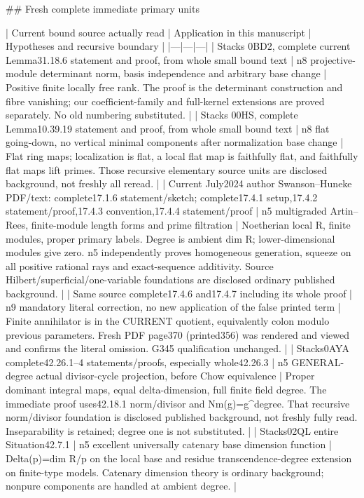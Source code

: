 \documentclass[11pt]{article}
\begin{document}
\begin{GrantData}
## Fresh complete immediate primary units

| Current bound source actually read | Application in this manuscript | Hypotheses and recursive boundary |
|---|---|---|
| Stacks 0BD2, complete current Lemma31.18.6 statement and proof, from whole small bound text | n8 projective-module determinant norm, basis independence and arbitrary base change | Positive finite locally free rank. The proof is the determinant construction and fibre vanishing; our coefficient-family and full-kernel extensions are proved separately. No old numbering substituted. |
| Stacks 00HS, complete Lemma10.39.19 statement and proof, from whole small bound text | n8 flat going-down, no vertical minimal components after normalization base change | Flat ring maps; localization is flat, a local flat map is faithfully flat, and faithfully flat maps lift primes. Those recursive elementary source units are disclosed background, not freshly all reread. |
| Current July2024 author Swanson--Huneke PDF/text: complete17.1.6 statement/sketch; complete17.4.1 setup,17.4.2 statement/proof,17.4.3 convention,17.4.4 statement/proof | n5 multigraded Artin--Rees, finite-module length forms and prime filtration | Noetherian local R, finite modules, proper primary labels. Degree is ambient dim R; lower-dimensional modules give zero. n5 independently proves homogeneous generation, squeeze on all positive rational rays and exact-sequence additivity. Source Hilbert/superficial/one-variable foundations are disclosed ordinary published background. |
| Same source complete17.4.6 and17.4.7 including its whole proof | n9 mandatory literal correction, no new application of the false printed term | Finite annihilator is in the CURRENT quotient, equivalently colon modulo previous parameters. Fresh PDF page370 (printed356) was rendered and viewed and confirms the literal omission. G345 qualification unchanged. |
| Stacks0AYA complete42.26.1--4 statements/proofs, especially whole42.26.3 | n5 GENERAL-degree actual divisor-cycle projection, before Chow equivalence | Proper dominant integral maps, equal delta-dimension, full finite field degree. The immediate proof uses42.18.1 norm/divisor and Nm(g)=g^degree. That recursive norm/divisor foundation is disclosed published background, not freshly fully read. Inseparability is retained; degree one is not substituted. |
| Stacks02QL entire Situation42.7.1 | n5 excellent universally catenary base dimension function | Delta(p)=dim R/p on the local base and residue transcendence-degree extension on finite-type models. Catenary dimension theory is ordinary background; nonpure components are handled at ambient degree. |

\end{GrantData}
\end{document}
